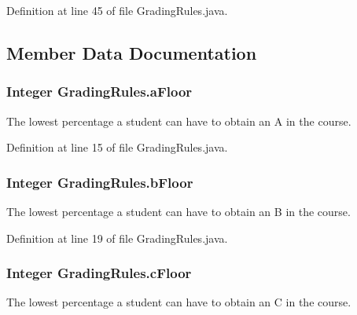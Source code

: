Definition at line 45 of file GradingRules.java.

\subsection{Member Data Documentation}
\hypertarget{classGradingRules_8b01111e235cf047ea844f87b9d2090f}{
\subsubsection{\setlength{\rightskip}{0pt plus 5cm}Integer {\bf GradingRules.aFloor}}}
\label{classGradingRules_8b01111e235cf047ea844f87b9d2090f}


The lowest percentage a student can have to obtain an A in the course. 



Definition at line 15 of file GradingRules.java.\hypertarget{classGradingRules_cf65a7bcb2ebbe708ccbb2143eb4c510}{
\subsubsection{\setlength{\rightskip}{0pt plus 5cm}Integer {\bf GradingRules.bFloor}}}
\label{classGradingRules_cf65a7bcb2ebbe708ccbb2143eb4c510}


The lowest percentage a student can have to obtain an B in the course. 



Definition at line 19 of file GradingRules.java.\hypertarget{classGradingRules_dc3b401172a5322cc6cec7b1605b6ffd}{
\subsubsection{\setlength{\rightskip}{0pt plus 5cm}Integer {\bf GradingRules.cFloor}}}
\label{classGradingRules_dc3b401172a5322cc6cec7b1605b6ffd}


The lowest percentage a student can have to obtain an C in the course. 



